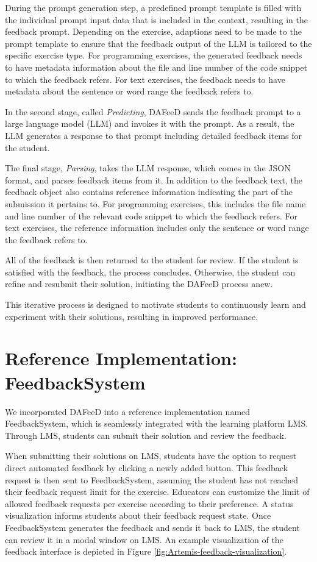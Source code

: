 \documentclass[manuscript,screen,review, anonymous]{acmart}
\begin{document}
During the prompt generation step, a predefined prompt template is filled with the individual prompt input data that is included in the context, resulting in the feedback prompt.
Depending on the exercise, adaptions need to be made to the prompt template to ensure that the feedback output of the LLM is tailored to the specific exercise type.
For programming exercises, the generated feedback needs to have metadata information about the file and line number of the code snippet to which the feedback refers.
For text exercises, the feedback needs to have metadata about the sentence or word range the feedback refers to.

In the second stage, called \textit{Predicting}, DAFeeD sends the feedback prompt to a large language model (LLM) and invokes it with the prompt. 
As a result, the LLM generates a response to that prompt including detailed feedback items for the student.

The final stage, \textit{Parsing}, takes the LLM response, which comes in the JSON format, and parses feedback items from it. 
In addition to the feedback text, the feedback object also contains reference information indicating the part of the submission it pertains to.
For programming exercises, this includes the file name and line number of the relevant code snippet to which the feedback refers.
For text exercises, the reference information includes only the sentence or word range the feedback refers to.

All of the feedback is then returned to the student for review.
If the student is satisfied with the feedback, the process concludes. 
Otherwise, the student can refine and resubmit their solution, initiating the DAFeeD process anew.

This iterative process is designed to motivate students to continuously learn and experiment with their solutions, resulting in improved performance.

\section{Reference Implementation: FeedbackSystem} %
\label{sec:reference-implementation}

We incorporated DAFeeD into a reference implementation named FeedbackSystem, which is seamlessly integrated with the learning platform LMS. 
Through LMS, students can submit their solution and review the feedback.

When submitting their solutions on LMS, students have the option to request direct automated feedback by clicking a newly added button.
This feedback request is then sent to FeedbackSystem, assuming the student has not reached their feedback request limit for the exercise.
Educators can customize the limit of allowed feedback requests per exercise according to their preference.
A status visualization informs students about their feedback request state.
Once FeedbackSystem generates the feedback and sends it back to LMS, the student can review it in a modal window on LMS.
An example visualization of the feedback interface is depicted in Figure \ref{fig:Artemis-feedback-visualization}.
\end{document}
